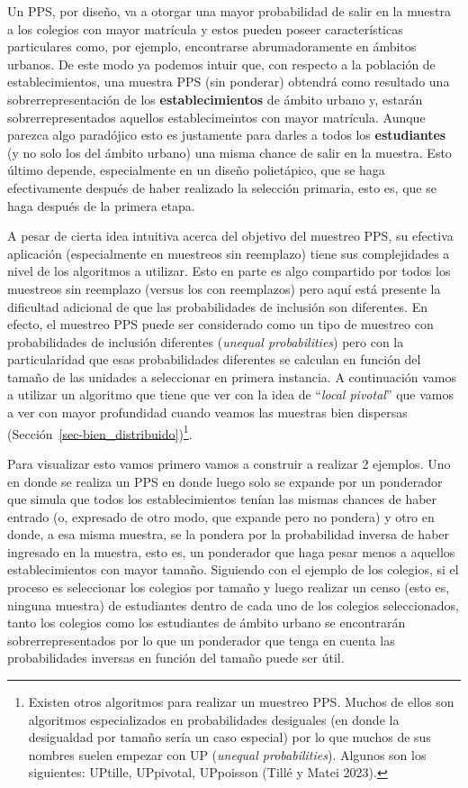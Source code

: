 \documentclass[
  spanish,
  a4paper,
]{scrreprt}
\begin{document}
Un PPS, por diseño, va a otorgar una mayor probabilidad de salir en la
muestra a los colegios con mayor matrícula y estos pueden poseer
características particulares como, por ejemplo, encontrarse
abrumadoramente en ámbitos urbanos. De este modo ya podemos intuir que,
con respecto a la población de establecimientos, una muestra PPS (sin
ponderar) obtendrá como resultado una sobrerrepresentación de los
\textbf{establecimientos} de ámbito urbano y, estarán
sobrerrepresentados aquellos establecimeintos con mayor matrícula.
Aunque parezca algo paradójico esto es justamente para darles a todos
los \textbf{estudiantes} (y no solo los del ámbito urbano) una misma
chance de salir en la muestra. Esto último depende, especialmente en un
diseño polietápico, que se haga efectivamente después de haber realizado
la selección primaria, esto es, que se haga después de la primera etapa.

A pesar de cierta idea intuitiva acerca del objetivo del muestreo PPS,
su efectiva aplicación (especialmente en muestreos sin reemplazo) tiene
sus complejidades a nivel de los algoritmos a utilizar. Esto en parte es
algo compartido por todos los muestreos sin reemplazo (versus los con
reemplazos) pero aquí está presente la dificultad adicional de que las
probabilidades de inclusión son diferentes. En efecto, el muestreo PPS
puede ser considerado como un tipo de muestreo con probabilidades de
inclusión diferentes (\emph{unequal probabilities}) pero con la
particularidad que esas probabilidades diferentes se calculan en función
del tamaño de las unidades a seleccionar en primera instancia. A
continuación vamos a utilizar un algoritmo que tiene que ver con la idea
de ``\emph{local pivotal}'' que vamos a ver con mayor profundidad cuando
veamos las muestras bien dispersas
(Sección~\ref{sec-bien_distribuido})\footnote{Existen otros algoritmos
  para realizar un muestreo PPS. Muchos de ellos son algoritmos
  especializados en probabilidades desiguales (en donde la desigualdad
  por tamaño sería un caso especial) por lo que muchos de sus nombres
  suelen empezar con UP (\emph{unequal probabilities}). Algunos son los
  siguientes: UPtille, UPpivotal, UPpoisson (Tillé y Matei 2023).}.

Para visualizar esto vamos primero vamos a construir a realizar 2
ejemplos. Uno en donde se realiza un PPS en donde luego solo se expande
por un ponderador que simula que todos los establecimientos tenían las
mismas chances de haber entrado (o, expresado de otro modo, que expande
pero no pondera) y otro en donde, a esa misma muestra, se la pondera por
la probabilidad inversa de haber ingresado en la muestra, esto es, un
ponderador que haga pesar menos a aquellos establecimientos con mayor
tamaño. Siguiendo con el ejemplo de los colegios, si el proceso es
seleccionar los colegios por tamaño y luego realizar un censo (esto es,
ninguna muestra) de estudiantes dentro de cada uno de los colegios
seleccionados, tanto los colegios como los estudiantes de ámbito urbano
se encontrarán sobrerrepresentados por lo que un ponderador que tenga en
cuenta las probabilidades inversas en función del tamaño puede ser útil.
\end{document}
